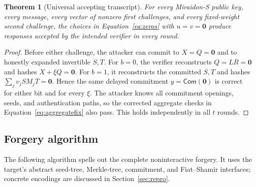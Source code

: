 \documentclass[10pt,a4paper]{article}
\newtheorem{theorem}{Theorem}
\newcommand{\Com}{\mathsf{Com}}
\newcommand{\matzero}{\mathbf{0}}
\newcommand{\vectzero}{\boldsymbol{0}}
\begin{document}
\begin{theorem}[Universal accepting transcript]
For every Miraidon-S public key, every message, every vector of nonzero first
challenges, and every fixed-weight second challenge, the choices in
Equation~\eqref{eq:zeros} with $u=v=\vectzero$ produce responses accepted by
the intended verifier in every round.
\end{theorem}

\begin{proof}
Before either challenge, the attacker can commit to $X=Q=\matzero$ and to
honestly expanded invertible $S,T$.  For $b=0$, the verifier reconstructs
$Q=LR=\matzero$ and hashes
$X+\xi Q=\matzero$.  For $b=1$, it reconstructs the committed $S,T$ and hashes
$\sum_jv_jSM_jT=\matzero$.  Hence the same delayed commitment
$y=\Com(\matzero)$ is correct for either bit and for every $\xi$.  The attacker
knows all commitment openings, seeds, and authentication paths, so the
corrected aggregate checks in Equation~\eqref{eq:aggregatefix} also pass.
This holds independently in all $t$ rounds.
\end{proof}

\subsection{Forgery algorithm}

The following algorithm spells out the complete noninteractive forgery.  It
uses the target's abstract seed-tree, Merkle-tree, commitment, and
Fiat--Shamir interfaces; concrete encodings are discussed in
Section~\ref{sec:repro}.
\end{document}
